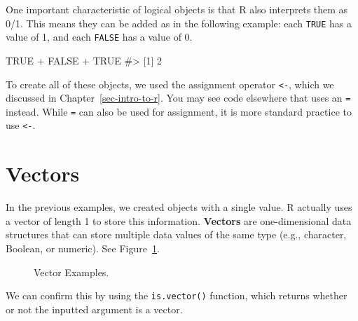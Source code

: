 \documentclass[
  letterpaper,
]{latex/krantz}
\makeatletter
\newenvironment{Shaded}{\begin{snugshade}}{\end{snugshade}}
\newcommand{\CommentTok}[1]{\textcolor[rgb]{0.37,0.37,0.37}{#1}}
\newcommand{\ConstantTok}[1]{\textcolor[rgb]{0.56,0.35,0.01}{#1}}
\newcommand{\SpecialCharTok}[1]{\textcolor[rgb]{0.37,0.37,0.37}{#1}}
\newenvironment{kframe}{%
\medskip{}
\setlength{\fboxsep}{.8em}
 \def\at@end@of@kframe{}%
 \ifinner\ifhmode%
  \def\at@end@of@kframe{\end{minipage}}%
  \begin{minipage}{\columnwidth}%
 \fi\fi%
 \def\FrameCommand##1{\hskip\@totalleftmargin \hskip-\fboxsep
 \colorbox{shadecolor}{##1}\hskip-\fboxsep
     \hskip-\linewidth \hskip-\@totalleftmargin \hskip\columnwidth}%
 \MakeFramed {\advance\hsize-\width
   \@totalleftmargin\z@ \linewidth\hsize
   \@setminipage}}%
 {\par\unskip\endMakeFramed%
 \at@end@of@kframe}
\renewenvironment{Shaded}{\begin{kframe}}{\end{kframe}}
\makeatother
\begin{document}
One important characteristic of logical objects is that R also
interprets them as 0/1. This means they can be added as in the following
example: each \texttt{TRUE} has a value of 1, and each \texttt{FALSE}
has a value of 0.

\begin{Shaded}
\begin{Highlighting}[]
\ConstantTok{TRUE} \SpecialCharTok{+} \ConstantTok{FALSE} \SpecialCharTok{+} \ConstantTok{TRUE}
\CommentTok{\#\textgreater{} [1] 2}
\end{Highlighting}
\end{Shaded}

To create all of these objects, we used the assignment
operator \texttt{\textless{}-}, which we
discussed in Chapter~\ref{sec-intro-to-r}. You may see code elsewhere
that uses an \texttt{=} instead. While \texttt{=} can also be used for
assignment, it is more standard practice to use \texttt{\textless{}-}.

\section{\texorpdfstring{Vectors
}{Vectors }}\label{vectors}

In the previous examples, we created objects with a single value. R
actually uses a vector of length 1 to store this information.
\textbf{Vectors} are one-dimensional data structures that can store
multiple data values of the same type (e.g., character, Boolean, or
numeric). See Figure~\ref{fig-vectors}.

\begin{figure}


\caption{\label{fig-vectors}Vector Examples.}

\end{figure}%

We can confirm this by using the
\texttt{is.vector()}
function, which returns whether or not the inputted argument is a
vector.
\end{document}
